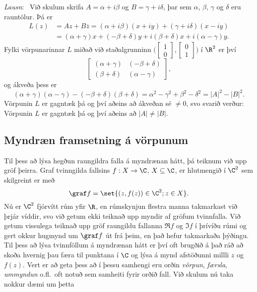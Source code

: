 \smallskip\noindent
{\it Lausn}: \ 
Við skulum skrifa $A={\alpha}+i{\beta}$ og
$B={\gamma}+i{\delta}$, þar sem ${\alpha}$, ${\beta}$, ${\gamma}$ og
${\delta}$ eru rauntölur.  Þá er
\begin{align*}
L(z)&=Az+B\overline z= ({\alpha}+i{\beta})(x+iy)+({\gamma}+i{\delta})(x-iy)\\
&=({\alpha}+{\gamma})x+(-{\beta}+{\delta})y+
i({\beta}+{\delta})x+i({\alpha}-{\gamma})y.
\end{align*}
Fylki vörpunarinnar $L$ miðað við staðalgrunninn
$\big(\left[\begin{matrix}1 \\ 0\end{matrix}\right],
\left[\begin{matrix}0 \\ 1\end{matrix}\right]\big)$ í
$\R^2$ er því
$$
\left[\begin{matrix} ({\alpha}+{\gamma}) & (-{\beta}+{\delta})\\
({\beta}+{\delta}) & ({\alpha}-{\gamma})\end{matrix}\right],
$$
og ákveða þess er 
$$
({\alpha}+{\gamma})({\alpha}-{\gamma})
      -(-{\beta}+{\delta})({\beta}+{\delta})
={\alpha}^2-{\gamma}^2+{\beta}^2-{\delta}^2=|A|^2-|B|^2.
$$
Vörpunin $L$ er gagntæk þá og því aðeins að ákveðan sé $\neq 0$, svo svarið
verður:  Vörpunin  $L$ er gagntæk þá og því aðeins að  $|A|\neq |B|$.


\subsection*{Myndræn framsetning á vörpunum}

Til þess að lýsa hegðun raungildra falla á myndrænan hátt, þá teiknum
við upp gröf þeirra.  Graf tvinngilda fallsins $f:X\to \C$, 
$X\subseteq \C$, er hlutmengið í $\C^2$ sem skilgreint er með
$$
\graf f=\set{(z,f(z))\in \C^2; z\in X}.
$$
Nú er $\C^2$ fjórvítt rúm yfir $\R$, en rúmskynjun flestra manna
takmarkast við þrjár víddir, svo við getum ekki teiknað upp myndir  af
gröfum tvinnfalla.  Við getum vissulega teiknað upp gröf raungildu
fallanna $\Re f$ og $\Im f$ í þrívíðu rúmi og gert okkur hugmynd 
um $\graf f$ út frá þeim, en það hefur takmarkaða þýðingu.  
Til þess að lýsa tvinnföllum á myndrænan hátt er því oft brugðið á það
ráð að skoða hvernig þau færa til punktana í $\C$ og lýsa á mynd
afstöðunni millli $z$ og $f(z)$. Vert er að geta þess að í þessu
samhengi eru orðin {\it vörpun}, {\it færsla}, {\it ummyndun}
o.fl.~oft notuð sem samheiti fyrir orðið fall.
Við skulum nú taka nokkur dæmi um þetta



